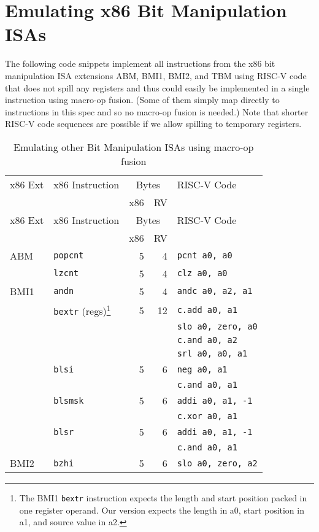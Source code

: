 \section{Emulating x86 Bit Manipulation ISAs}

The following code snippets implement all instructions from the x86 bit manipulation
ISA extensions ABM, BMI1, BMI2, and TBM using RISC-V code that does not spill any
registers and thus could easily be implemented in a single instruction using macro-op
fusion. (Some of them simply map directly to instructions in this spec and so no
macro-op fusion is needed.) Note that shorter RISC-V code sequences are possible if
we allow spilling to temporary registers.

\begin{longtable}[c]{@{}llrrl@{}}
\caption{Emulating other Bit Manipulation ISAs using macro-op fusion}\tabularnewline
\toprule
x86 Ext & x86 Instruction & \multicolumn{2}{c}{Bytes} & RISC-V Code\tabularnewline
        &                 & x86 & RV            &\tabularnewline
\midrule
\endfirsthead
\toprule
x86 Ext & x86 Instruction & \multicolumn{2}{c}{Bytes} & RISC-V Code\tabularnewline
        &                 & x86 & RV            &\tabularnewline
\midrule
\endhead
ABM  & {\tt popcnt}           & 5 &  4 & {\tt pcnt a0, a0}\tabularnewline
\cline{2-5}
     & {\tt lzcnt}            & 5 &  4 & {\tt clz a0, a0}\tabularnewline
\midrule
BMI1 & {\tt andn}             & 5 &  4 & {\tt andc a0, a2, a1}\tabularnewline
\cline{2-5}
     & {\tt bextr} (regs)\footnote{
         The BMI1 {\tt bextr} instruction expects the length and start position packed in one
	 register operand. Our version expects the length in a0, start position in a1, and source
	 value in a2.
                            } & 5 & 12 & {\tt c.add a0, a1}\tabularnewline
     &                        &   &    & {\tt slo a0, zero, a0}\tabularnewline
     &                        &   &    & {\tt c.and a0, a2}\tabularnewline
     &                        &   &    & {\tt srl a0, a0, a1}\tabularnewline
\cline{2-5}
     & {\tt blsi}             & 5 &  6 & {\tt neg a0, a1}\tabularnewline
     &                        &   &    & {\tt c.and a0, a1}\tabularnewline
\cline{2-5}
     & {\tt blsmsk}           & 5 &  6 & {\tt addi a0, a1, -1}\tabularnewline
     &                        &   &    & {\tt c.xor a0, a1}\tabularnewline
\cline{2-5}
     & {\tt blsr}             & 5 &  6 & {\tt addi a0, a1, -1}\tabularnewline
     &                        &   &    & {\tt c.and a0, a1}\tabularnewline
\midrule
BMI2 & {\tt bzhi}             & 5 &  6 & {\tt slo a0, zero, a2}\tabularnewline

\end{longtable}
